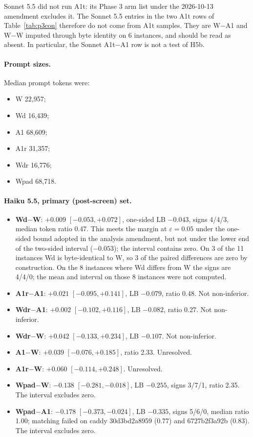 \documentclass[10pt]{article}
\newcommand{\eps}{\varepsilon}
\begin{document}
Sonnet 5.5 did not run A1t: its Phase 3 arm list under the 2026-10-13 amendment excludes it. The Sonnet 5.5 entries in the two A1t rows of Table~\ref{tab:p3con} therefore do not come from A1t samples. They are W$-$A1 and W$-$W imputed through byte identity on 6 instances, and should be read as absent. In particular, the Sonnet A1t$-$A1 row is not a test of H5b.

\paragraph{Prompt sizes.} Median prompt tokens were:
\begin{itemize}
\item W 22,957;
\item Wd 16,439;
\item A1 68,609;
\item A1r 31,357;
\item Wdr 16,776;
\item Wpad 68,718.
\end{itemize}

\paragraph{Haiku 5.5, primary (post-screen) set.}
\begin{itemize}
\item \textbf{Wd$-$W}: $+0.009$ $[-0.053, +0.072]$, one-sided LB $-0.043$, signs 4/4/3, median token ratio 0.47. This meets the margin at $\eps = 0.05$ under the one-sided bound adopted in the analysis amendment, but not under the lower end of the two-sided interval ($-0.053$); the interval contains zero. On 3 of the 11 instances Wd is byte-identical to W, so 3 of the paired differences are zero by construction. On the 8 instances where Wd differs from W the signs are 4/4/0; the mean and interval on those 8 instances were not computed.
\item \textbf{A1r$-$A1}: $+0.021$ $[-0.095, +0.141]$, LB $-0.079$, ratio 0.48. Not non-inferior.
\item \textbf{Wdr$-$A1}: $+0.002$ $[-0.102, +0.116]$, LB $-0.082$, ratio 0.27. Not non-inferior.
\item \textbf{Wdr$-$W}: $+0.042$ $[-0.133, +0.234]$, LB $-0.107$. Not non-inferior.
\item \textbf{A1$-$W}: $+0.039$ $[-0.076, +0.185]$, ratio 2.33. Unresolved.
\item \textbf{A1r$-$W}: $+0.060$ $[-0.114, +0.248]$. Unresolved.
\item \textbf{Wpad$-$W}: $-0.138$ $[-0.281, -0.018]$, LB $-0.255$, signs 3/7/1, ratio 2.35. The interval excludes zero.
\item \textbf{Wpad$-$A1}: $-0.178$ $[-0.373, -0.024]$, LB $-0.335$, signs 5/6/0, median ratio 1.00; matching failed on caddy 30d3bd2a8959 (0.77) and 6727b2f3a92b (0.83). The interval excludes zero.
\end{itemize}
\end{document}
